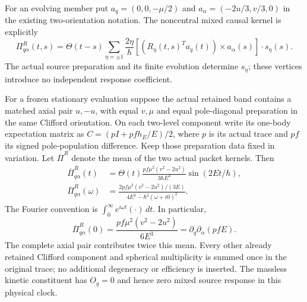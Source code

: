 \documentclass[12pt,a4paper]{article}
\begin{document}
\begin{corollary}
For an evolving member put
$a_q=(0,0,-\mu/2)$ and
$a_\alpha=(-2u/3,v/3,0)$ in the existing two-orientation notation.
The noncentral mixed causal kernel is explicitly
\begin{equation}
\label{p4:eq:v2212-conformal-shape-retarded}
 \boxed{\Pi^R_{q\alpha}(t,s)=\Theta(t-s)
 \sum_{\eta=\pm1}\frac{2\eta}{\hbar}
 [(R_\eta(t,s)^Ta_q(t))\times a_\alpha(s)]
                       \cdot s_\eta(s).}
\end{equation}
The actual source preparation and its finite evolution determine
$s_\eta$; these vertices introduce no independent response coefficient.

For a frozen stationary evaluation suppose the actual retained band
contains a matched axial pair $u,-u$, with equal $v,\mu$ and equal
pole-diagonal preparation in the same Clifford orientation. On each
two-level component write its one-body expectation matrix as
$C=(pI+pfh_E/E)/2$, where $p$ is its actual trace and $pf$ its signed
pole-population difference. Keep those preparation data fixed in
variation. Let $\overline\Pi^R$ denote the mean of the two actual packet
kernels. Then
\begin{equation}
\label{p4:eq:v2212-conformal-shape-stationary}
 \boxed{\begin{aligned}
 \overline\Pi^R_{q\alpha}(t)
 &=\Theta(t)\frac{pf\mu^2(v^2-2u^2)}{3\hbar E^2}
                         \sin(2Et/\hbar),\\
 \overline\Pi^R_{q\alpha}(\omega)
 &=\frac{2pf\mu^2(v^2-2u^2)/(3E)}
              {4E^2-\hbar^2(\omega+i0)^2}.
 \end{aligned}}
\end{equation}
The Fourier convention is $\int_0^\infty e^{i\omega t}(\cdot)\,dt$.
In particular,
\begin{equation}
\label{p4:eq:v2212-conformal-shape-static}
 \boxed{\overline\Pi^R_{q\alpha}(0)
 =\frac{pf\mu^2(v^2-2u^2)}{6E^3}
 =\partial_q\partial_\alpha(pfE).}
\end{equation}
The complete axial pair contributes twice this mean. Every other
already retained Clifford component and spherical multiplicity is summed
once in the original trace; no additional degeneracy or efficiency is
inserted. The massless kinetic constituent has $O_q=0$ and hence zero
mixed source response in this physical clock.
\end{corollary}
\end{document}

